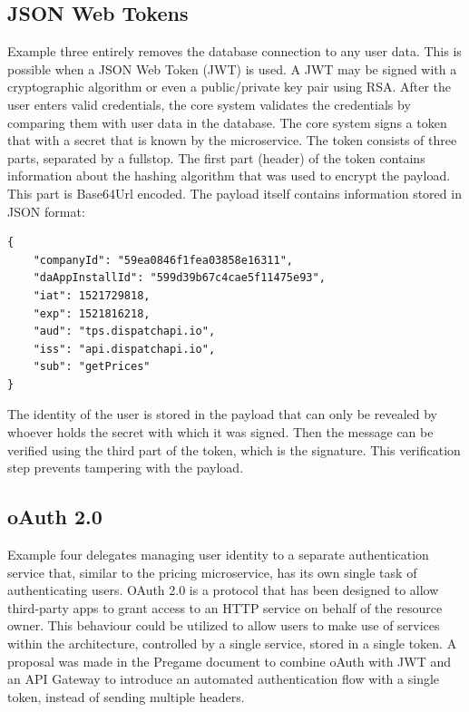 \subsection{JSON Web Tokens}
Example three entirely removes the database connection to any user data. This is possible when a JSON Web Token (JWT) is used. A JWT may be signed with a cryptographic algorithm or even a public/private key pair using RSA. After the user enters valid credentials, the core system validates the credentials by comparing them with user data in the database. The core system signs a token that with a secret that is known by the microservice. The token consists of three parts, separated by a fullstop. The first part (header) of the token contains information about the hashing algorithm that was used to encrypt the payload. This part is Base64Url encoded. The payload itself contains information stored in JSON format:


\begin{center}
\end{center}

\begin{Verbatim}[fontsize=\scriptsize]
{
	"companyId": "59ea0846f1fea03858e16311",
	"daAppInstallId": "599d39b67c4cae5f11475e93",
	"iat": 1521729818,
	"exp": 1521816218,
	"aud": "tps.dispatchapi.io",
	"iss": "api.dispatchapi.io",
	"sub": "getPrices"
}
\end{Verbatim}

The identity of the user is stored in the payload that can only be revealed by whoever holds the secret with which it was signed. Then the message can be verified using the third part of the token, which is the signature. This verification step prevents tampering with the payload.

\subsection{oAuth 2.0}
Example four delegates managing user identity to a separate authentication service that, similar to the pricing microservice, has its own single task of authenticating users. OAuth 2.0 is a protocol that has been designed to allow third-party apps to grant access to an HTTP service on behalf of the resource owner. This behaviour could be utilized to allow users to make use of services within the architecture, controlled by a single service, stored in a single token. A proposal was made in the Pregame document  to combine oAuth with JWT and an API Gateway to introduce an automated authentication flow with a single token, instead of sending multiple headers.

